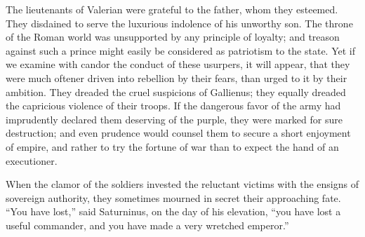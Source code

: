 



The lieutenants of Valerian were grateful to the father, whom
they esteemed. They disdained to serve the luxurious indolence of
his unworthy son. The throne of the Roman world was unsupported
by any principle of loyalty; and treason against such a prince
might easily be considered as patriotism to the state. Yet if we
examine with candor the conduct of these usurpers, it will
appear, that they were much oftener driven into rebellion by
their fears, than urged to it by their ambition. They dreaded the
cruel suspicions of Gallienus; they equally dreaded the
capricious violence of their troops. If the dangerous favor of
the army had imprudently declared them deserving of the purple,
they were marked for sure destruction; and even prudence would
counsel them to secure a short enjoyment of empire, and rather to
try the fortune of war than to expect the hand of an executioner.

When the clamor of the soldiers invested the reluctant victims
with the ensigns of sovereign authority, they sometimes mourned
in secret their approaching fate. “You have lost,” said
Saturninus, on the day of his elevation, “you have lost a useful
commander, and you have made a very wretched emperor.”\footnotemark[164]



